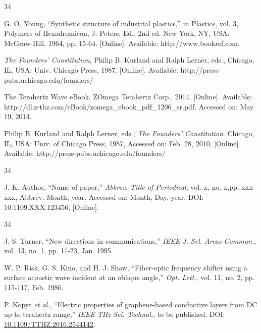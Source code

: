 \documentclass{IEEEjmw}
\begin{document}
\vspace*{-12pt}

\begin{thebibliography}{34}
\setcounter{enumiv}{9}

\bibitem{}G. O. Young, ``Synthetic structure of industrial plastics,'' in Plastics, vol. 3, Polymers of Hexadromicon, J. Peters, Ed., 2nd ed. New York, NY, USA: McGraw-Hill, 1964, pp. 15-64. [Online]. Available: http://www.bookref.com. 

\bibitem{} {\em The Founders' Constitution}, Philip B. Kurland and Ralph Lerner, eds., Chicago, IL, USA: Univ. Chicago Press, 1987. [Online]. Available: http://press-pubs.uchicago.edu/founders/

\bibitem{} The Terahertz Wave eBook. ZOmega Terahertz Corp., 2014. [Online]. Available: http://dl.z-thz.com/eBook/zomega\_ebook\_pdf\_1206\_sr.pdf. Accessed on: May 19, 2014. 

\bibitem{} Philip B. Kurland and Ralph Lerner, eds., {\em The Founders' Constitution}. Chicago, IL, USA: Univ. of Chicago Press, 1987, Accessed on: Feb. 28, 2010, [Online] Available: http://press-pubs.uchicago.edu/founders/ 
\end{thebibliography}\vspace*{-3pt}

\vspace*{-12pt}
\begin{thebibliography}{34}
\item[]\hskip-18pt J. K. Author, ``Name of paper,'' {\em Abbrev. Title of Periodical}, vol. x, no. x,\break pp. xxx-xxx, Abbrev. Month, year. Accessed on: Month, Day, year, DOI: 10.1109.XXX.123456, [Online].
\end{thebibliography}\vspace*{-12pt}

\vspace*{-12pt}

\begin{thebibliography}{34}
\setcounter{enumiv}{13}

\bibitem{}J. S. Turner, ``New directions in communications,'' {\em IEEE J. Sel. Areas Commun.}, vol. 13, no. 1, pp. 11-23, Jan. 1995. %

\bibitem{} W. P. Risk, G. S. Kino, and H. J. Shaw, ``Fiber-optic frequency shifter using a surface acoustic wave incident at an oblique angle,'' {\em Opt. Lett.}, vol. 11, no. 2, pp. 115-117, Feb. 1986. %

\bibitem{} P. Kopyt {\em et al.}, ``Electric properties of graphene-based conductive layers from DC up to terahertz range,'' {\em IEEE THz Sci. Technol.}, to be published. DOI: \href{https://dx.doi.org/10.1109.XXX.123456}{10.1109/TTHZ.2016.2544142}.
\end{thebibliography}\vspace*{-3pt}
\end{document}
